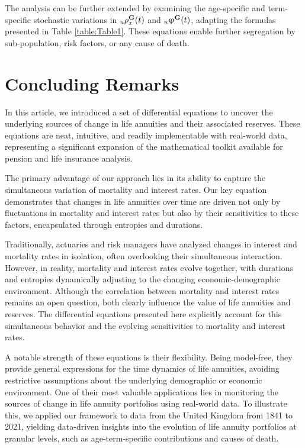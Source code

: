 \documentclass[12pt]{article}
\begin{document}
The analysis can be further extended by examining the age-specific and term-specific stochastic variations in \( {}_u{\rho}^{\bf{G}}_x(t) \) and \( {}_u{\upvarphi}^{\bf{G}}(t) \), adapting the formulas presented in Table \ref{table:Table1}. These equations enable further segregation by sub-population, risk factors, or any cause of death.



\section{Concluding Remarks}\label{sec:6_Conclusion}

In this article, we introduced a set of differential equations to uncover the underlying sources of change in life annuities and their associated reserves. These equations are neat, intuitive, and readily implementable with real-world data, representing a significant expansion of the mathematical toolkit available for pension and life insurance analysis.

The primary advantage of our approach lies in its ability to capture the simultaneous variation of mortality and interest rates. Our key equation demonstrates that changes in life annuities over time are driven not only by fluctuations in mortality and interest rates but also by their sensitivities to these factors, encapsulated through entropies and durations.

Traditionally, actuaries and risk managers have analyzed changes in interest and mortality rates in isolation, often overlooking their simultaneous interaction. However, in reality, mortality and interest rates evolve together, with durations and entropies dynamically adjusting to the changing economic-demographic environment. Although the correlation between mortality and interest rates remains an open question, both clearly influence the value of life annuities and reserves. The differential equations presented here explicitly account for this simultaneous behavior and the evolving sensitivities to mortality and interest rates.

A notable strength of these equations is their flexibility. Being model-free, they provide general expressions for the time dynamics of life annuities, avoiding restrictive assumptions about the underlying demographic or economic environment. One of their most valuable applications lies in monitoring the sources of change in life annuity portfolios using real-world data. \color{blue}To illustrate this, we applied our framework to data from the United Kingdom from 1841 to 2021, \color{black} yielding data-driven insights into the evolution of life annuity portfolios at granular levels, such as age-term-specific contributions and causes of death.
\end{document}
